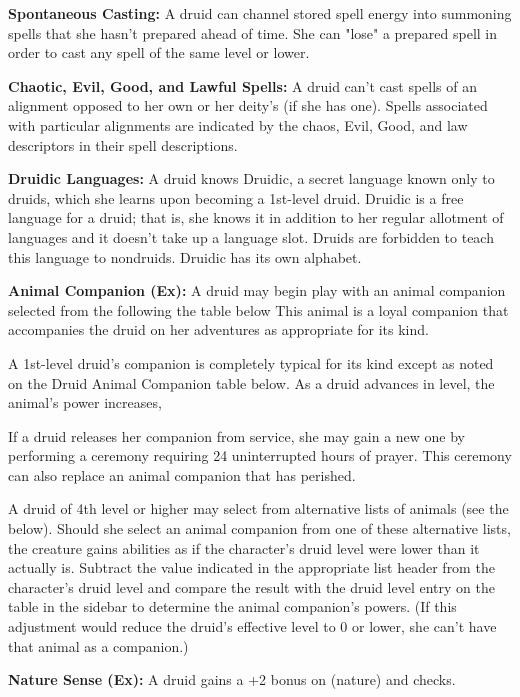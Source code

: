 \textbf{Spontaneous Casting:} A druid can channel stored spell energy into summoning spells that she hasn't prepared ahead of time. She can "lose" a prepared spell in order to cast any  spell of the same level or lower.

\textbf{Chaotic, Evil, Good, and Lawful Spells:} A druid can't cast spells of an alignment opposed to her own or her deity's (if she has one). Spells associated with particular alignments are indicated by the chaos, Evil, Good, and law descriptors in their spell descriptions.

\textbf{Druidic Languages:} A druid knows Druidic, a secret language known only to druids, which she learns upon becoming a 1st-level druid. Druidic is a free language for a druid; that is, she knows it in addition to her regular allotment of languages and it doesn't take up a language slot. Druids are forbidden to teach this language to nondruids. Druidic has its own alphabet.

\textbf{Animal Companion (Ex):} A druid may begin play with an animal companion selected from the following the table below This animal is a loyal companion that accompanies the druid on her adventures as appropriate for its kind.

A 1st-level druid’s companion is completely typical for its kind except as noted on the Druid Animal Companion table below. As a druid advances in level, the animal’s power increases,

If a druid releases her companion from service, she may gain a new one by performing a ceremony requiring 24 uninterrupted hours of prayer. This ceremony can also replace an animal companion that has perished.

A druid of 4th level or higher may select from alternative lists of animals (see the below). Should she select an animal companion from one of these alternative lists, the creature gains abilities as if the character’s druid level were lower than it actually is. Subtract the value indicated in the appropriate list header from the character’s druid level and compare the result with the druid level entry on the table in the sidebar to determine the animal companion’s powers. (If this adjustment would reduce the druid’s effective level to 0 or lower, she can’t have that animal as a companion.) 

\textbf{Nature Sense (Ex):} A druid gains a +2 bonus on  (nature) and  checks.

